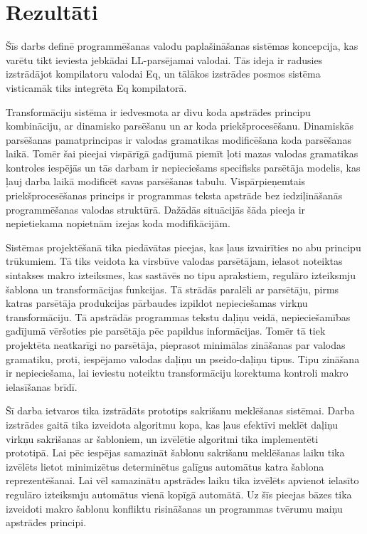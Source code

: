 \section*{Rezultāti}
\label{s:results}

Šīs darbs definē programmēšanas valodu paplašināšanas sistēmas koncepcija, kas varētu tikt ieviesta jebkādai LL-parsējamai valodai. Tās ideja ir radusies izstrādājot kompilatoru valodai Eq, un tālākos izstrādes posmos sistēma visticamāk tiks integrēta Eq kompilatorā. 

Transformāciju sistēma ir iedvesmota ar divu koda apstrādes principu kombināciju, ar dinamisko parsēšanu un ar koda priekšprocesēšanu. Dinamiskās parsēšanas pamatprincipas ir valodas gramatikas modificēšana koda parsēšanas laikā. Tomēr šai pieejai vispārīgā gadījumā piemīt ļoti mazas valodas gramatikas kontroles iespējās un tās darbam ir nepieciešams specifisks parsētāja modelis, kas ļauj darba laikā modificēt savas parsēšanas tabulu. Vispārpieņemtais priekšprocesēšanas princips ir programmas teksta apstrāde bez iedziļināšanās programmēšanas valodas struktūrā. Dažādās situācijās šāda pieeja ir nepietiekama nopietnām izejas koda modifikācijām.

Sistēmas projektēšanā tika piedāvātas pieejas, kas ļaus izvairīties no abu principu trūkumiem. Tā tiks veidota ka virsbūve valodas parsētājam, ielasot noteiktas sintakses makro izteiksmes, kas sastāvēs no tipu aprakstiem, regulāro izteiksmju šablona un transformācijas funkcijas. Tā strādās paralēli ar parsētāju, pirms katras parsētāja produkcijas pārbaudes izpildot nepieciešamas virkņu transformāciju. Tā apstrādās programmas tekstu daļiņu veidā, nepieciešamības gadījumā vēršoties pie parsētāja pēc papildus informācijas. Tomēr tā tiek projektēta neatkarīgi no parsētāja, pieprasot minimālas zināšanas par valodas gramatiku, proti, iespējamo valodas daļiņu un pseido-daļiņu tipus. Tipu zināšana ir nepieciešama, lai ieviestu noteiktu transformāciju korektuma kontroli makro ielasīšanas brīdī.

Šī darba ietvaros tika izstrādāts prototips sakrišanu meklēšanas sistēmai. Darba izstrādes gaitā tika izveidota algoritmu kopa, kas ļaus efektīvi meklēt daļiņu virkņu sakrišanas ar šabloniem, un izvēlētie algoritmi tika implementēti prototipā. Lai pēc iespējas samazināt šablonu sakrišanu meklēšanas laiku tika izvēlēts lietot minimizētus determinētus galīgus automātus katra šablona reprezentēšanai. Lai vēl samazinātu apstrādes laiku tika izvēlēts apvienot ielasīto regulāro izteiksmju automātus vienā kopīgā automātā. Uz šīs pieejas bāzes tika izveidoti makro šablonu konfliktu risināšanas un programmas tvērumu maiņu apstrādes principi.

